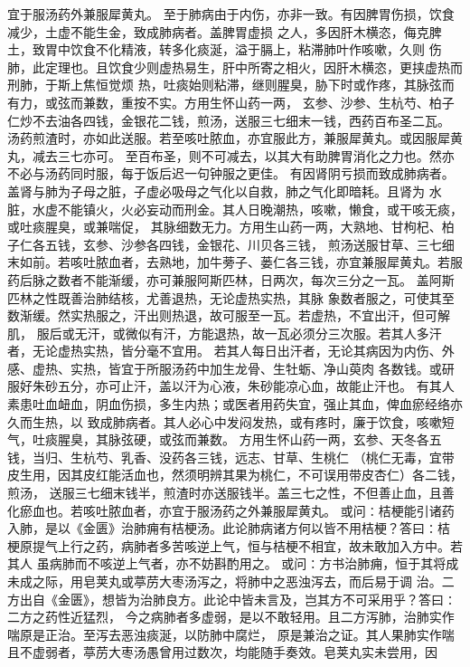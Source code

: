 \documentclass[a4paper,12pt,UTF8,twoside]{ctexbook}
\begin{document}
宜于服汤药外兼服犀黄丸。 
至于肺病由于内伤，亦非一致。有因脾胃伤损，饮食减少，土虚不能生金，致成肺病者。盖脾胃虚损 
之人，多因肝木横恣，侮克脾土，致胃中饮食不化精液，转多化痰涎，溢于膈上，粘滞肺叶作咳嗽，久则 
伤肺，此定理也。且饮食少则虚热易生，肝中所寄之相火，因肝木横恣，更挟虚热而刑肺，于斯上焦恒觉烦 
热，吐痰始则粘滞，继则腥臭，胁下时或作疼，其脉弦而有力，或弦而兼数，重按不实。方用生怀山药一两， 
玄参、沙参、生杭芍、柏子仁炒不去油各四钱，金银花二钱，煎汤，送服三七细末一钱，西药百布圣二瓦。 
汤药煎渣时，亦如此送服。若至咳吐脓血，亦宜服此方，兼服犀黄丸。或因服犀黄丸，减去三七亦可。 
至百布圣，则不可减去，以其大有助脾胃消化之力也。然亦不必与汤药同时服，每于饭后迟一句钟服之更佳。 
有因肾阴亏损而致成肺病者。盖肾与肺为子母之脏，子虚必吸母之气化以自救，肺之气化即暗耗。且肾为 
水脏，水虚不能镇火，火必妄动而刑金。其人日晚潮热，咳嗽，懒食，或干咳无痰，或吐痰腥臭，或兼喘促， 
其脉细数无力。方用生山药一两，大熟地、甘枸杞、柏子仁各五钱，玄参、沙参各四钱，金银花、川贝各三钱， 
煎汤送服甘草、三七细末如前。若咳吐脓血者，去熟地，加牛蒡子、蒌仁各三钱，亦宜兼服犀黄丸。若服 
药后脉之数者不能渐缓，亦可兼服阿斯匹林，日两次，每次三分之一瓦。 
盖阿斯匹林之性既善治肺结核，尤善退热，无论虚热实热，其脉 
象数者服之，可使其至数渐缓。然实热服之，汗出则热退，故可服至一瓦。若虚热，不宜出汗，但可解肌， 
服后或无汗，或微似有汗，方能退热，故一瓦必须分三次服。若其人多汗者，无论虚热实热，皆分毫不宜用。 
若其人每日出汗者，无论其病因为内伤、外感、虚热、实热，皆宜于所服汤药中加生龙骨、生牡蛎、净山萸肉 
各数钱。或研服好朱砂五分，亦可止汗，盖以汗为心液，朱砂能凉心血，故能止汗也。 
有其人素患吐血衄血，阴血伤损，多生内热；或医者用药失宜，强止其血，俾血瘀经络亦久而生热，以 
致成肺病者。其人必心中发闷发热，或有疼时，廉于饮食，咳嗽短气，吐痰腥臭，其脉弦硬，或弦而兼数。 
方用生怀山药一两，玄参、天冬各五钱，当归、生杭芍、乳香、没药各三钱，远志、甘草、生桃仁 
（桃仁无毒，宜带皮生用，因其皮红能活血也，然须明辨其果为桃仁，不可误用带皮杏仁）各二钱，煎汤， 
送服三七细末钱半，煎渣时亦送服钱半。盖三七之性，不但善止血，且善 
化瘀血也。若咳吐脓血者，亦宜于服汤药之外兼服犀黄丸。 
或问∶桔梗能引诸药入肺，是以《金匮》治肺痈有桔梗汤。此论肺病诸方何以皆不用桔梗？答曰∶桔 
梗原提气上行之药，病肺者多苦咳逆上气，恒与桔梗不相宜，故未敢加入方中。若其人 
虽病肺而不咳逆上气者，亦不妨斟酌用之。 
或问∶方书治肺痈，恒于其将成未成之际，用皂荚丸或葶苈大枣汤泻之，将肺中之恶浊泻去，而后易于调 
治。二方出自《金匮》，想皆为治肺良方。此论中皆未言及，岂其方不可采用乎？答曰∶二方之药性近猛烈， 
今之病肺者多虚弱，是以不敢轻用。且二方泻肺，治肺实作喘原是正治。至泻去恶浊痰涎，以防肺中腐烂， 
原是兼治之证。其人果肺实作喘且不虚弱者，葶苈大枣汤愚曾用过数次，均能随手奏效。皂荚丸实未尝用，因 
\end{document}
